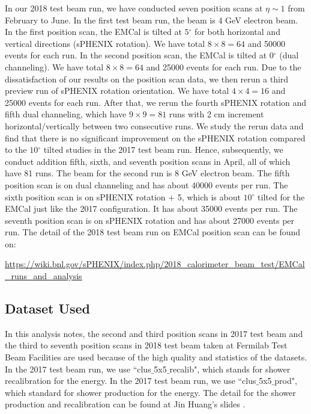 \documentclass[hidelinks,11pt]{article}
\numberwithin{figure}{section}
\numberwithin{table}{section}
\newcommand{\degree}{\mbox{$^\circ$}\xspace}
\begin{document}
In our 2018 test beam run, we have conducted seven position scans at $\eta \sim 1$ from February to June. In the first test beam run, the beam is 4 GeV electron beam. In the first position scan, the EMCal is tilted at $5 \degree$ for both horizontal and vertical directions (sPHENIX rotation). We have total $8 \times 8 = 64$ and 50000 events for each run. In the second position scan, the EMCal is tilted at $0 \degree$ (dual channeling). We have total $8 \times 8 = 64$ and 25000 events for each run. Due to the dissatisfaction of our results on the position scan data, we then rerun a third preview run of sPHENIX rotation orientation. We have total $4 \times 4 = 16$ and 25000 events for each run. After that, we rerun the fourth sPHENIX rotation and fifth dual channeling, which have $9 \times 9 = 81$ runs with 2 cm increment horizontal/vertically between two consecutive runs. We study the rerun data and find that there is no significant improvement on the sPHENIX rotation compared to the $10 \degree$ tilted studies in the 2017 test beam run. Hence, subsequently, we conduct addition fifth, sixth, and seventh position scans in April, all of which have 81 runs. The beam for the second run is 8 GeV electron beam.  The fifth position scan is on dual channeling and has about 40000 events per run. The sixth position scan is on sPHENIX rotation + 5, which is about $10 \degree$ tilted for the EMCal just like the 2017 configuration. It has about 35000 events per run. The seventh position scan is on sPHENIX rotation and has about 27000 events per run. The detail of the 2018 test beam run on EMCal position scan can be found on:

\url{https://wiki.bnl.gov/sPHENIX/index.php/2018_calorimeter_beam_test/EMCal_runs_and_analysis}

\subsection{Dataset Used}

In this analysis notes, the second and third position scans in 2017 test beam and the third to seventh position scans in 2018 test beam taken at Fermilab Test Beam Facilities are used because of the high quality and statistics of the datasets. In the 2017 test beam run, we use ``clus$\_$5x5$\_$recalib", which stands for shower recalibration for the energy.  In the 2017 test beam run, we use ``clus$\_$5x5$\_$prod", which standard for shower production for the energy. The detail for the shower production and recalibration can be found at Jin Huang's slides \cite{Calib}.
\end{document}
